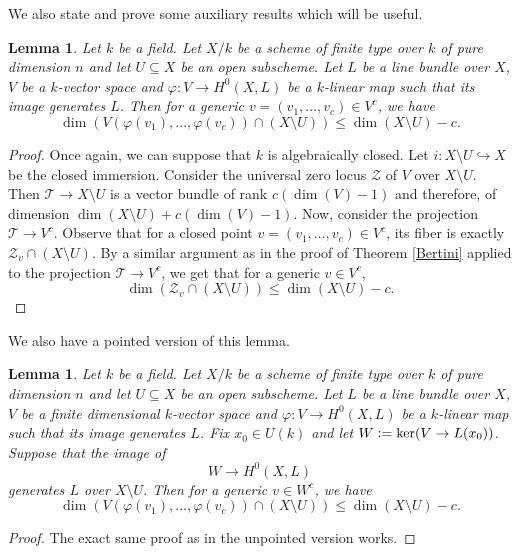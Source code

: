 \documentclass[a4paper,12pt]{amsart}
\newtheorem{lemma}[definition]{Lemma}
\numberwithin{equation}{section}
\newcommand{\defeq}{\vcentcolon=}
\renewcommand{\leq}{\leqslant}
\renewcommand{\_}{\rule{0.25cm}{0.4pt}}
\begin{document}
We also state and prove some auxiliary results which will be useful.

\begin{lemma}\label{ignorar fechado}
    Let $k$ be a field. Let $X/k$ be a scheme of finite type over $k$ of pure dimension $n$ and let $U\subseteq X$ be an open subscheme. Let $L$ be a line bundle over $X$, $V$ be a $k$-vector space and $\varphi\colon V\to H^{0}(X,L)$ be a $k$-linear map such that its image generates $L$. Then for a generic $v=(v_{1},\dots, v_{c})\in V^{c}$, we have 
    \[
    \dim(V(\varphi(v_{1}),\dots, \varphi(v_{c}))\cap (X\setminus U))\leq \dim (X\setminus U)-c.
    \]
\end{lemma}
\begin{proof}
    Once again, we can suppose that $k$ is algebraically closed. Let $i\colon X\setminus U\hookrightarrow X$ be the closed immersion. Consider the universal zero locus $\mathcal{Z}$ of $V$ over $X\setminus U$. Then $\mathcal{T}\to X\setminus U$ is a vector bundle of rank $c(\dim(V)-1)$ and therefore, of dimension $\dim (X\setminus U)+c(\dim(V)-1)$. Now, consider the projection $\mathcal{T}\to V^{c}$. Observe that for a closed point $v=(v_{1},\dots, v_{c})\in V^{c}$, its fiber is exactly $\mathcal{Z}_{v}\cap (X\setminus U)$. By a similar argument as in the proof of Theorem \ref{Bertini} applied to the projection $\mathcal{T}\to V^{c}$, we get that for a generic $v\in V^{c}$,
    \[
    \dim(\mathcal{Z}_{v}\cap (X\setminus U))\leq \dim (X\setminus U)-c.
    \]
\end{proof}

We also have a pointed version of this lemma.

\begin{lemma}\label{ignorar fechado pontuado}
Let $k$ be a field. Let $X/k$ be a scheme of finite type over $k$ of pure dimension $n$ and let $U\subseteq X$ be an open subscheme. Let $L$ be a line bundle over $X$, $V$ be a finite dimensional $k$-vector space and $\varphi\colon V\to H^{0}(X,L)$ be a $k$-linear map such that its image generates $L$. Fix $x_{0}\in U(k)$ and let $W\defeq \ker(V\to L(x_{0}))$. Suppose that the image of
\[
W\to H^{0}(X,L)
\]
generates $L$ over $X\setminus U$. Then for a generic $v\in W^{c}$, we have 
\[
\dim(V(\varphi(v_{1}),\dots, \varphi(v_{c}))\cap (X\setminus U))\leq \dim (X\setminus U)-c.
\]
\end{lemma}
\begin{proof}
    The exact same proof as in the unpointed version works.
\end{proof}
\end{document}
